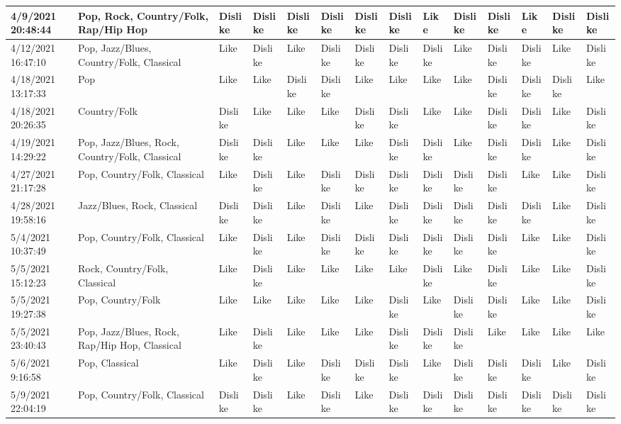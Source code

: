\begin{table}
{\begin{tabular}{|l|l|l|l|l|l|l|l|l|l|l|l|l|l|}
        4/9/2021 20:48:44 & Pop, Rock, Country/Folk, Rap/Hip Hop & Dislike & Dislike & Dislike & Dislike & Dislike & Dislike & Like & Dislike & Dislike & Like & Dislike & Dislike \\ \hline
        4/12/2021 16:47:10 & Pop, Jazz/Blues, Country/Folk, Classical & Like & Dislike & Like & Dislike & Dislike & Dislike & Dislike & Like & Dislike & Dislike & Like & Dislike \\ \hline
        4/18/2021 13:17:33 & Pop & Like & Like & Dislike & Dislike & Like & Like & Like & Like & Dislike & Dislike & Dislike & Like \\ \hline
        4/18/2021 20:26:35 & Country/Folk & Dislike & Like & Like & Like & Dislike & Dislike & Like & Like & Dislike & Dislike & Like & Dislike \\ \hline
        4/19/2021 14:29:22 & Pop, Jazz/Blues, Rock, Country/Folk, Classical & Dislike & Dislike & Like & Like & Like & Dislike & Dislike & Like & Dislike & Dislike & Like & Dislike \\ \hline
        4/27/2021 21:17:28 & Pop, Country/Folk, Classical & Like & Dislike & Like & Dislike & Dislike & Dislike & Dislike & Dislike & Dislike & Like & Like & Dislike \\ \hline
        4/28/2021 19:58:16 & Jazz/Blues, Rock, Classical & Dislike & Dislike & Like & Dislike & Like & Dislike & Dislike & Dislike & Dislike & Dislike & Like & Dislike \\ \hline
        5/4/2021 10:37:49 & Pop, Country/Folk, Classical & Like & Dislike & Like & Dislike & Dislike & Dislike & Dislike & Dislike & Dislike & Like & Like & Dislike \\ \hline
        5/5/2021 15:12:23 & Rock, Country/Folk, Classical & Like & Dislike & Like & Like & Like & Like & Dislike & Like & Dislike & Like & Like & Dislike \\ \hline
        5/5/2021 19:27:38 & Pop, Country/Folk & Like & Like & Like & Like & Like & Dislike & Like & Dislike & Dislike & Like & Like & Dislike \\ \hline
        5/5/2021 23:40:43 & Pop, Jazz/Blues, Rock, Rap/Hip Hop, Classical & Like & Dislike & Like & Like & Like & Dislike & Dislike & Dislike & Like & Like & Like & Like \\ \hline
        5/6/2021 9:16:58 & Pop, Classical & Like & Dislike & Like & Dislike & Dislike & Dislike & Like & Dislike & Dislike & Dislike & Like & Dislike \\ \hline
        5/9/2021 22:04:19 & Pop, Country/Folk, Classical & Dislike & Dislike & Like & Dislike & Like & Dislike & Dislike & Dislike & Dislike & Dislike & Dislike & Dislike \\ \hline

\end{tabular}}
\end{table}
